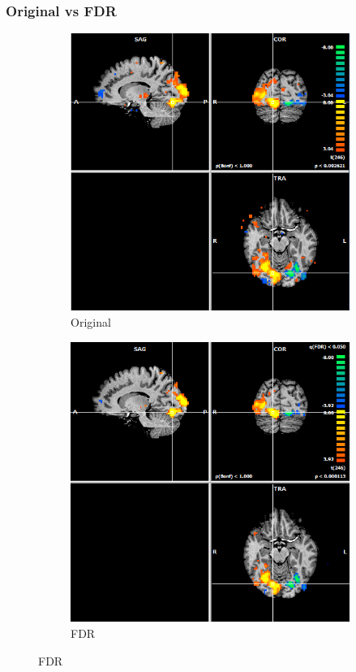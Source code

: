 \documentclass{beamer}
\begin{document}
\begin{frame}
\frametitle{Original vs FDR}
\begin{figure}
    \centering
    \begin{subfigure}[b]{0.48\textwidth}
        \includegraphics[width=\textwidth]{Images/Brainvoyager83187129.png}
	\caption{Original}
    \end{subfigure}
    \begin{subfigure}[b]{0.48\textwidth}
        \includegraphics[width=\textwidth]{Images/Brainvoyager-FDR83187129.png}
	\caption{FDR}
    \end{subfigure}
\end{figure}
\end{frame}
\end{document}
